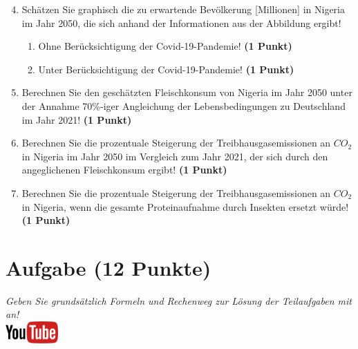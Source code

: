 \documentclass[a4paper, 9pt]{scrartcl}\usepackage[]{graphicx}\usepackage[]{xcolor}
\begin{document}
\begin{enumerate}
  \setcounter{enumi}{3}  
\item Sch{\"a}tzen Sie graphisch die zu erwartende Bev{\"o}lkerung [Millionen] in Nigeria im
  Jahr 2050, die sich anhand der Informationen aus der Abbildung ergibt!
\begin{enumerate}
\item Ohne Ber{\"u}cksichtigung der Covid-19-Pandemie! \textbf{(1
    Punkt)}
\item Unter Ber{\"u}cksichtigung der Covid-19-Pandemie! \textbf{(1
    Punkt)}
\end{enumerate}
\item Berechnen Sie den gesch{\"a}tzten Fleischkonsum von Nigeria im Jahr
  2050 unter der Annahme 70\%-iger Angleichung der Lebensbedingungen zu
  Deutschland im Jahr 2021! \textbf{(1 Punkt)}
\item Berechnen Sie die prozentuale Steigerung der Treibhausgasemissionen
  an $CO_2$ in Nigeria im Jahr 2050 im Vergleich zum Jahr 2021, der
  sich durch den angeglichenen Fleischkonsum ergibt! \textbf{(1 Punkt)}
\item Berechnen Sie die prozentuale Steigerung der Treibhausgasemissionen
  an $CO_2$ in Nigeria, wenn die gesamte Proteinaufnahme 
  durch Insekten ersetzt w{\"u}rde! \textbf{(1
    Punkt)}
\end{enumerate}







 
\clearpage

\section{Aufgabe \hfill (12 Punkte)}

\textit{Geben Sie grunds{\"a}tzlich Formeln und Rechenweg zur L{\"o}sung der
  Teilaufgaben mit an!} \\[1Ex]

\hfill\href{https://youtu.be/flRBo1FWQy0}{\includegraphics[width = 2cm]{img/youtube}} %
\hspace{2Ex}
\end{document}
